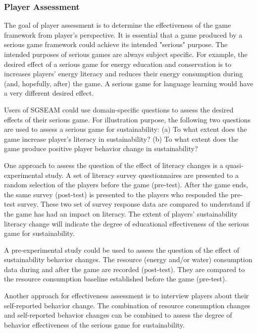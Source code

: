 \documentclass{sigchi}
\begin{document}
\subsubsection{Player Assessment}

The goal of player assessment is to determine the effectiveness of the game
framework from player's perspective. It is essential that a game produced by a serious game
framework could achieve its intended "serious" purpose. The intended purposes of serious games are
always subject specific. For example, the desired effect of a serious game for
energy education and conservation is to increases players' energy literacy and
reduces their energy consumption during (and, hopefully, after) the game. A serious game for
language learning would have a very different desired effect.

Users of SGSEAM could use domain-specific questions to assess the desired effects of their
serious game. For illustration purpose, the following two questions are used to assess a serious
game for sustainability: (a) To what extent does the game increase player's literacy in
sustainability? (b) To what extent does the game produce positive player behavior change in
sustainability?

One approach to assess the question of the effect of literacy changes is a quasi-experimental
study. A set of literacy survey questionnaires are presented to a random selection of the players
before the game (pre-test). After the game ends, the same survey (post-test) is presented to the
players who responded the pre-test survey. These two set of survey response data are compared to
understand if the game has had an impact on literacy. The extent of players' sustainability
literacy change will indicate the degree of educational effectiveness of the serious game for
sustainability.

A pre-experimental study could be used to assess the question of the effect of
sustainability behavior changes. The resource (energy and/or water) consumption data during and
after the game are recorded (post-test). They are compared to the resource consumption baseline
established before the game (pre-test).

Another approach for effectiveness assessment is to interview players about their self-reported
behavior change. The combination of resource consumption changes and self-reported behavior changes
can be combined to assess the degree of behavior effectiveness of the serious game for
sustainability.
\end{document}
